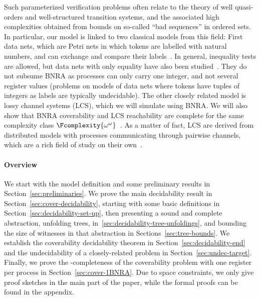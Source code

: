 Such parameterized verification problems often relate to the theory of well quasi-orders and well-structured transition systems, and the associated high complexities obtained from bounds on so-called ``bad sequences'' in ordered sets. In particular, our model is linked to two classical models from this field: First data nets, which are Petri nets in which tokens are labelled with natural numbers, and can exchange and compare their labels~\cite{LazicNORW08}. In general, inequality tests are allowed, but data nets with only equality have also been studied~\cite{Rosa-Velardo17}. They do not subsume BNRA as processes can only carry one integer, and not several register values (problems on models of data nets where tokens have tuples of integers as labels are typically undecidable).
The other closely related model is lossy channel systems (LCS)\cite{AbdullaJ1996verif}, which we will simulate using BNRA. We will also show that BNRA coverability and LCS reachability are complete for the same complexity class $\Fcomplexity{\omega^\omega}$~\cite{ChambartS08ordinal, Schnoebelen2002verifying}.
As a matter of fact, LCS are derived from distributed models with processes communicating through pairwise channels, which are a rich field of study on their own~\cite{Aiswarya2015model,Aiswarya2020networks}.

\paragraph*{Overview}


We start with the model definition and some preliminary results in Section~\ref{sec:preliminaries}. We prove the main decidability result in Section~\ref{sec:cover-decidability}, starting with some basic definitions in Section~\ref{sec:decidability-set-up}, then presenting a sound and complete abstraction, unfolding trees, in~\ref{sec:decidability-tree-unfoldings}, and bounding the size of witnesses in that abstraction in Sections~\ref{sec:tree-bounds}. We establish the coverability decidability theorem in Section~\ref{sec:decidability-end} and the undecidability of a closely-related problem in Section~\ref{sec:undec-target}. Finally, we prove the \NP-completeness of the coverability problem with one register per process in Section~\ref{sec:cover-1BNRA}.
Due to space constraints, we only give proof sketches in the main part of the paper, while the formal proofs can be found in the appendix.


